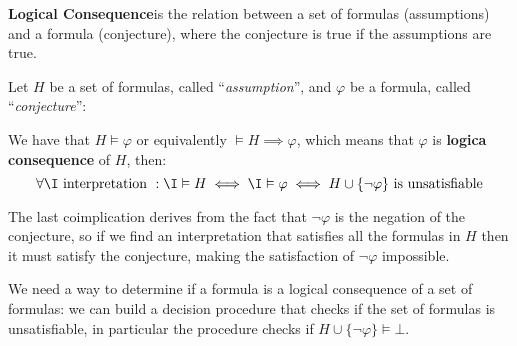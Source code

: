 \textbf{Logical Consequence}is the relation between a set of formulas (assumptions) and 
a formula (conjecture), where the conjecture is true if the assumptions are true.

Let $H$ be a set of formulas, called ``\textit{assumption}'',
and $\varphi$ be a formula, called ``\textit{conjecture}'':

We have that $H \vDash \varphi$ or equivalently $\vDash H \implies \varphi$,
which means that $\varphi$ is \textbf{logica consequence} of $H$, then:
\begin{equation*}
    \forall \I \text{ interpretation }: \I \vDash H 
    \iff \I \vDash \varphi \iff H \cup \{\neg \varphi\} \text{ is unsatisfiable}
\end{equation*}

The last coimplication derives from the fact that $\neg \varphi$ is the negation of 
the conjecture, so if we find an interpretation that satisfies all the formulas in $H$ 
then it must satisfy the conjecture, making the satisfaction of 
$\neg \varphi$ impossible.

We need a way to determine if a formula is a logical consequence of a set of formulas:
we can build a decision procedure that checks if the set of formulas is unsatisfiable,
in particular the procedure checks if $H \cup \{\neg \varphi\} \vDash \bot$.

